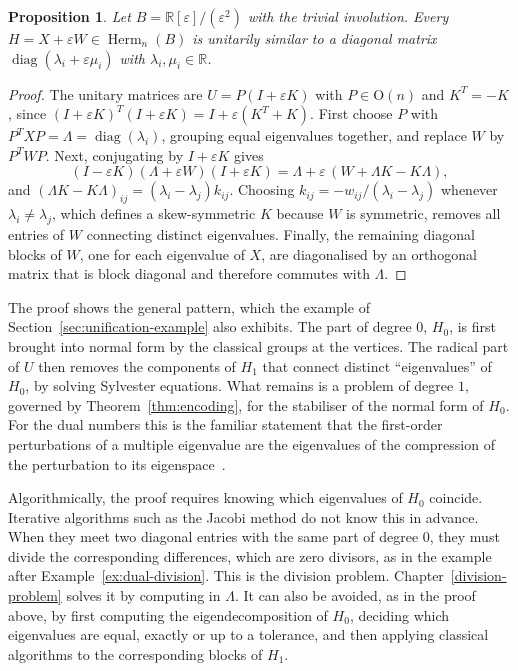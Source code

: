 \documentclass[12pt, a4paper]{report}
\theoremstyle{plain}
\newtheorem{proposition}[theorem]{Proposition}
\theoremstyle{definition}
\theoremstyle{remark}
\theoremstyle{plain}
\newcommand{\RR}{\mathbb{R}}
\newcommand{\Or}{\mathrm{O}}
\newcommand{\Herm}{\operatorname{Herm}}
\DeclareMathOperator{\diag}{diag}
\begin{document}
\begin{proposition}\label{prop:dual-spectral}
Let $B=\RR[\varepsilon]/(\varepsilon^2)$ with the trivial involution. Every $H=X+\varepsilon W\in\Herm_n(B)$ is unitarily similar to a diagonal matrix $\diag(\lambda_i+\varepsilon\mu_i)$ with $\lambda_i,\mu_i\in\RR$.
\end{proposition}
\begin{proof}
The unitary matrices are $U=P(I+\varepsilon K)$ with $P\in\Or(n)$ and $K^T=-K$, since $(I+\varepsilon K)^T(I+\varepsilon K)=I+\varepsilon(K^T+K)$. First choose $P$ with $P^TXP=\Lambda=\diag(\lambda_i)$, grouping equal eigenvalues together, and replace $W$ by $P^TWP$. Next, conjugating by $I+\varepsilon K$ gives
\[ (I-\varepsilon K)(\Lambda+\varepsilon W)(I+\varepsilon K)=\Lambda+\varepsilon\,(W+\Lambda K-K\Lambda), \]
and $(\Lambda K-K\Lambda)_{ij}=(\lambda_i-\lambda_j)k_{ij}$. Choosing $k_{ij}=-w_{ij}/(\lambda_i-\lambda_j)$ whenever $\lambda_i\neq\lambda_j$, which defines a skew-symmetric $K$ because $W$ is symmetric, removes all entries of $W$ connecting distinct eigenvalues. Finally, the remaining diagonal blocks of $W$, one for each eigenvalue of $X$, are diagonalised by an orthogonal matrix that is block diagonal and therefore commutes with $\Lambda$.
\end{proof}

The proof shows the general pattern, which the example of Section~\ref{sec:unification-example} also exhibits. The part of degree $0$, $H_0$, is first brought into normal form by the classical groups at the vertices. The radical part of $U$ then removes the components of $H_1$ that connect distinct ``eigenvalues'' of $H_0$, by solving Sylvester equations. What remains is a problem of degree $1$, governed by Theorem~\ref{thm:encoding}, for the stabiliser of the normal form of $H_0$. For the dual numbers this is the familiar statement that the first-order perturbations of a multiple eigenvalue are the eigenvalues of the compression of the perturbation to its eigenspace~\cite{Kato1995}.

Algorithmically, the proof requires knowing which eigenvalues of $H_0$ coincide. Iterative algorithms such as the Jacobi method do not know this in advance. When they meet two diagonal entries with the same part of degree $0$, they must divide the corresponding differences, which are zero divisors, as in the example after Example~\ref{ex:dual-division}. This is the division problem. Chapter~\ref{division-problem} solves it by computing in $\Lambda$. It can also be avoided, as in the proof above, by first computing the eigendecomposition of $H_0$, deciding which eigenvalues are equal, exactly or up to a tolerance, and then applying classical algorithms to the corresponding blocks of $H_1$.
\end{document}
